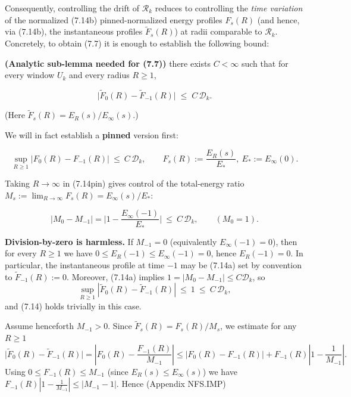 \documentclass[
  11pt,
]{article}
\begin{document}
Consequently, controlling the drift of \(\mathcal R_k\) reduces to controlling the \emph{time variation} of the normalized (7.14b) pinned-normalized energy profiles \(F_s(R)\) (and hence, via (7.14b), the instantaneous profiles \(\widetilde F_s(R)\)) at radii comparable to \(\mathcal R_k\). Concretely, to obtain (7.7) it is enough to establish the following bound:

\textbf{(Analytic sub-lemma needed for (7.7))} there exists \(C<\infty\) such that for every window \(U_k\) and every radius \(R\ge1\),

\begin{equation}
\big|\widetilde F_0(R)-\widetilde F_{-1}(R)\big|
\;\le\;
C\,\mathcal D_k.
\tag{7.14}
\end{equation}

(Here \(\widetilde F_s(R)=E_R(s)/E_\infty(s)\).)

We will in fact establish a \textbf{pinned} version first:

\begin{equation}
\sup_{R\ge1}\big|F_0(R)-F_{-1}(R)\big|\ \le\ C\,\mathcal D_k,
\qquad
F_s(R):=\frac{E_R(s)}{E_*},\ E_*:=E_\infty(0).
\tag{7.14pin}
\end{equation}

Taking \(R\to\infty\) in (7.14pin) gives control of the total-energy ratio \(M_s:=\lim_{R\to\infty}F_s(R)=E_\infty(s)/E_*\):

\begin{equation}
|M_0-M_{-1}|=\Big|1-\frac{E_\infty(-1)}{E_*}\Big| \ \le\ C\,\mathcal D_k,
\qquad (M_0=1).
\tag{7.14a}
\end{equation}

\textbf{Division-by-zero is harmless.} If \(M_{-1}=0\) (equivalently \(E_\infty(-1)=0\)), then for every \(R\ge1\) we have \(0\le E_R(-1)\le E_\infty(-1)=0\), hence \(E_R(-1)=0\). In particular, the instantaneous profile at time \(-1\) may be (7.14a) set by convention to \(\widetilde F_{-1}(R):=0\). Moreover, (7.14a) implies \(1=|M_0-M_{-1}|\le C\mathcal D_k\), so \[
\sup_{R\ge1}|\widetilde F_0(R)-\widetilde F_{-1}(R)|
\ \le\ 1
\ \le\ C\,\mathcal D_k,
\] and (7.14) holds trivially in this case.

Assume henceforth \(M_{-1}>0\). Since \(\widetilde F_s(R)=F_s(R)/M_s\), we estimate for any \(R\ge1\) \[
\big|\widetilde F_0(R)-\widetilde F_{-1}(R)\big|
=\left|F_0(R)-\frac{F_{-1}(R)}{M_{-1}}\right|
\le |F_0(R)-F_{-1}(R)|+F_{-1}(R)\left|1-\frac1{M_{-1}}\right|.
\] Using \(0\le F_{-1}(R)\le M_{-1}\) (since \(E_R(s)\le E_\infty(s)\)) we have \(F_{-1}(R)\left|1-\frac1{M_{-1}}\right|\le |M_{-1}-1|\). Hence (Appendix NFS.IMP)
\end{document}
